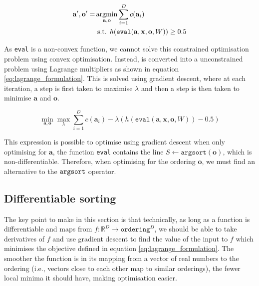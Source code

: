 \begin{align} \label{eq:recourse_gen_interventions}
	\mathbf{a}', \mathbf{o}' = & \operatorname*{argmin}_{\mathbf{a, o}} \sum_{i=1}^D c(\mathbf{a}_i) \\ \nonumber
	& \text{ s.t. } h(\texttt{eval}(\mathbf{a, x, o}, W)) \geq 0.5
\end{align}

As \texttt{eval} is a non-convex function, we cannot solve this constrained optimisation problem using convex optimisation. Instead, is converted into a unconstrained problem using Lagrange multipliers as shown in equation \ref{eq:lagrange_formulation}. This is solved using gradient descent, where at each iteration, a step is first taken to maximise $\lambda$ and then a step is then taken to minimise $\mathbf{a}$ and $\mathbf{o}$.

\begin{equation} \label{eq:lagrange_formulation}
	\min_{\mathbf{a, o}} \max_\lambda \sum_{i=1}^D c(\mathbf{a}_i) - \lambda (h(\texttt{eval}(\mathbf{a, x, o}, W))-0.5)
\end{equation}

This expression is possible to optimise using gradient descent when only optimising for $\mathbf{a}$, the function \texttt{eval} contains the line $S \leftarrow \texttt{argsort}(\mathbf{o})$, which is non-differentiable. Therefore, when optimising for the ordering $\mathbf{o}$, we must find an alternative to the $\operatorname*{\texttt{argsort}}$ operator.

\subsection{Differentiable sorting}

The key point to make in this section is that technically, as long as a function is differentiable and maps from $f: \mathbb{R}^D \rightarrow \texttt{ordering}^D$, we should be able to take derivatives of $f$ and use gradient descent to find the value of the input to $f$ which minimises the objective defined in equation \ref{eq:lagrange_formulation}. The smoother the function is in its mapping from a vector of real numbers to the ordering (i.e., vectors close to each other map to similar orderings), the fewer local minima it should have, making optimisation easier.